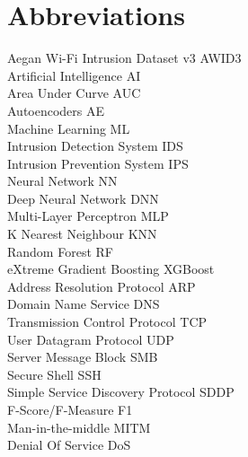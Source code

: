 
\section*{Abbreviations}
\large 

Aegan Wi-Fi Intrusion Dataset v3 \hfill AWID3 \\
Artificial Intelligence \hfill AI \\
Area Under Curve \hfill AUC \\
Autoencoders \hfill AE \\
Machine Learning \hfill ML \\
Intrusion Detection System \hfill IDS \\
Intrusion Prevention System \hfill IPS \\
Neural Network \hfill NN \\
Deep Neural Network \hfill DNN \\
Multi-Layer Perceptron \hfill MLP \\
K Nearest Neighbour \hfill KNN \\
Random Forest \hfill RF \\
eXtreme Gradient Boosting \hfill XGBoost \\
Address Resolution Protocol \hfill ARP \\
Domain Name Service \hfill DNS \\
Transmission Control Protocol \hfill TCP \\
User Datagram Protocol \hfill UDP \\
Server Message Block \hfill SMB \\
Secure Shell \hfill SSH \\
Simple Service Discovery Protocol \hfill SDDP \\
F-Score/F-Measure \hfill F1 \\
Man-in-the-middle \hfill MITM \\
Denial Of Service \hfill DoS \\
\\

